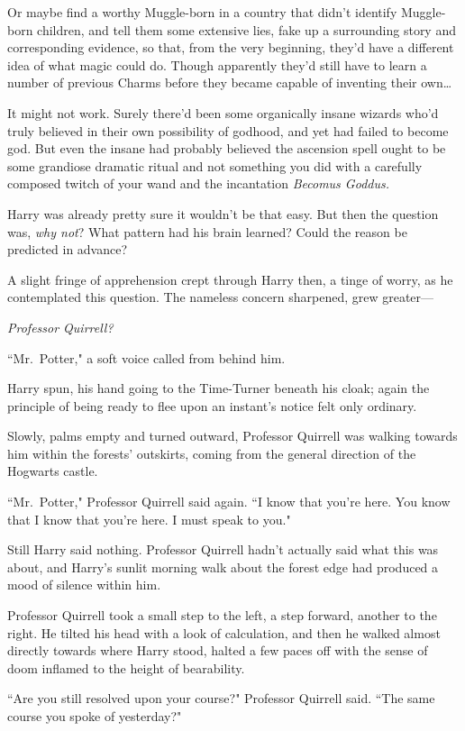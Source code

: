 Or maybe find a worthy Muggle-born in a country that didn't identify Muggle-born children, and tell them some extensive lies, fake up a surrounding story and corresponding evidence, so that, from the very beginning, they'd have a different idea of what magic could do. Though apparently they'd still have to learn a number of previous Charms before they became capable of inventing their own{\ldots}

It might not work. Surely there'd been some organically insane wizards who'd truly believed in their own possibility of godhood, and yet had failed to become god. But even the insane had probably believed the ascension spell ought to be some grandiose dramatic ritual and not something you did with a carefully composed twitch of your wand and the incantation \emph{Becomus Goddus.}

Harry was already pretty sure it wouldn't be that easy. But then the question was, \emph{why not}? What pattern had his brain learned? Could the reason be predicted in advance?

A slight fringe of apprehension crept through Harry then, a tinge of worry, as he contemplated this question. The nameless concern sharpened, grew greater---

\emph{Professor Quirrell?}

``Mr.~Potter," a soft voice called from behind him.

Harry spun, his hand going to the Time-Turner beneath his cloak; again the principle of being ready to flee upon an instant's notice felt only ordinary.

Slowly, palms empty and turned outward, Professor Quirrell was walking towards him within the forests' outskirts, coming from the general direction of the Hogwarts castle.

``Mr.~Potter," Professor Quirrell said again. ``I know that you're here. You know that I know that you're here. I must speak to you."

Still Harry said nothing. Professor Quirrell hadn't actually said what this was about, and Harry's sunlit morning walk about the forest edge had produced a mood of silence within him.

Professor Quirrell took a small step to the left, a step forward, another to the right. He tilted his head with a look of calculation, and then he walked almost directly towards where Harry stood, halted a few paces off with the sense of doom inflamed to the height of bearability.

``Are you still resolved upon your course?" Professor Quirrell said. ``The same course you spoke of yesterday?"

